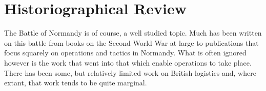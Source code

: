 \documentclass[noraggedright]{turabian-researchpaper}
\begin{document}
\section{Historiographical Review}











The Battle of Normandy is of course, a well studied topic.  Much has been
written on this battle from books on the Second World War at large to 
publications that focus squarely on operations and tactics in Normandy.  What
is often ignored however is the work that went into that which enable 
operations to take place.  There has been some, but relatively limited work
on British logistics and, where extant, that work tends to be quite marginal.


\end{document}
